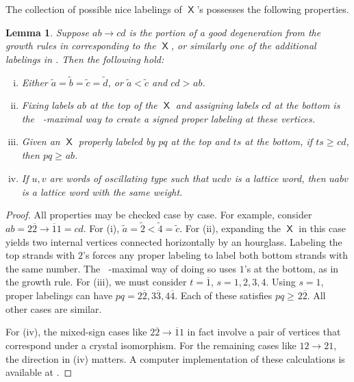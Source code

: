 \documentclass{amsart}
\newtheorem{lemma}[theorem]{Lemma}
\theoremstyle{definition}
\theoremstyle{remark}
\numberwithin{equation}{section}
\DeclareMathOperator{\tlex}{l\widetilde{ex}}
\DeclareMathOperator{\sfX}{\mathsf{X}}
\begin{document}
The collection of possible nice labelings of $\sfX$'s possesses the following properties.

\begin{lemma}\label{lem:growth_lex}
  Suppose $ab \to cd$ is the portion of a good degeneration from the growth rules in  corresponding to the $\sfX$, or similarly one of the additional labelings in . Then the following hold:
  \begin{enumerate}[(i)]
    \item Either $\tilde{a}=\tilde{b}=\tilde{c}=\tilde{d}$, or $\tilde{a} < \tilde{c}$ and $cd >_{\tlex} ab$.
    \item Fixing labels $ab$ at the top of the $\sfX$ and assigning labels $cd$ at the bottom is the $\tlex$-maximal way to create a signed proper labeling at these vertices.
    \item Given an $\sfX$ properly labeled by $pq$ at the top and $ts$ at the bottom, if $ts \geq_{\tlex} cd$, then $pq \geq_{\tlex} ab$.
    \item If $u, v$ are words of oscillating type such that $ucdv$ is a lattice word, then $uabv$ is a lattice word with the same weight.
  \end{enumerate}
\end{lemma}

\begin{proof}
  All properties may be checked case by case. For example, consider $ab = 2\overline{2} \to \overline{1}1 = cd$. For (i), $\tilde{a} = \tilde{2} < \tilde{4} = \tilde{c}$. For (ii), expanding the $\sfX$ in this case yields two internal vertices connected horizontally by an hourglass. Labeling the top strands with $2$'s forces any proper labeling to label both bottom strands with the same number. The $\tlex$-maximal way of doing so uses $1$'s at the bottom, as in the growth rule. For (iii), we must consider $t=\overline{1}$, $s=1, 2, 3, 4$. Using $s=1$, proper labelings can have $pq=2\overline{2}, 3\overline{3}, 4\overline{4}$. Each of these satisfies $pq \geq_{\tlex} 2\overline{2}$. All other cases are similar.
  
  For (iv), the mixed-sign cases like $2\overline{2} \to \overline{1}1$ in fact involve a pair of vertices that correspond under a crystal isomorphism. For the remaining cases like $12 \to 21$, the direction in (iv) matters. A computer implementation of these calculations is available at \cite[\S8]{sl4-web-basis-code}.
\end{proof}
\end{document}
